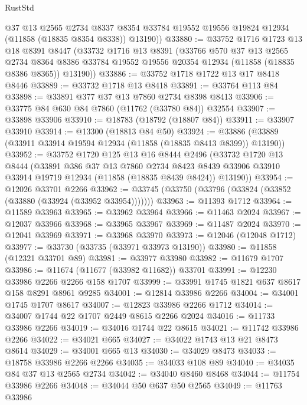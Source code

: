 \begin{lexlean}{RustStd}
\begin{coremodule}
        @37
        @13
        @2565
        @2734
        @8337
        @8354
        @33784
        @19552
        @19556
        @19824
        @12934
        (@11858 (@18835 @8354 @8338))
        @13190))
@33880 := @33752
    @1716
    @1723
    @13
    @18
    @8391
    @8447
    (@33732
      @1716
      @13
      @8391
      (@33766
        @570
        @37
        @13
        @2565
        @2734
        @8364
        @8386
        @33784
        @19552
        @19556
        @20354
        @12934
        (@11858 (@18835 @8386 @8365))
        @13190))
@33886 := @33752 @1718 @1722 @13 @17 @8418 @8446
@33889 := @33732 @1718 @13 @8418
@33891 := @33764 @113 @84
@33898 := @33891 @377 @37 @13 @7860 @2734 @8398 @8413
@33906 := @33775 @84 @630 @84 @7860 (@11762 (@33780 @84)) @32554
@33907 := @33898 @33906
@33910 := @18783 (@18792 (@18807 @84))
@33911 := @33907 @33910
@33914 := @13300 (@18813 @84 @50)
@33924 := @33886 (@33889 (@33911 @33914 @19594 @12934 (@11858 (@18835 @8413 @8399)) @13190))
@33952 := @33752
    @1720
    @125
    @13
    @16
    @8444
    @2496
    (@33732
      @1720
      @13
      @8444
      (@33891
        @386
        @37
        @13
        @7860
        @2734
        @8423
        @8439
        @33906
        @33910
        @33914
        @19719
        @12934
        (@11858 (@18835 @8439 @8424))
        @13190))
@33954 := @12026 @33701 @2266
@33962 := @33745 (@33750 (@33796 (@33824 (@33852 (@33880 (@33924 (@33952 @33954)))))))
@33963 := @11393 @1712
@33964 := @11589 @33963
@33965 := @33962 @33964
@33966 := @11463 @2024
@33967 := @12037 @33966
@33968 := @33965 @33967
@33969 := @11487 @2024
@33970 := @12041 @33969
@33971 := @33968 @33970
@33973 := @12046 (@12048 @1712)
@33977 := @33730 (@33735 (@33971 @33973 @13190))
@33980 := @11858 (@12321 @33701 @89)
@33981 := @33977 @33980
@33982 := @11679 @1707
@33986 := @11674 (@11677 (@33982 @11682)) @33701
@33991 := @12230 @33986 @2266 @2266 @158 @1707
@33999 := @33991 @1745 @1821 @637 @8617 @158 @8291 @8961 @9285
@34001 := @12814 @33986 @2266
@34004 := @34001 @1745 @1707 @8617
@34007 := @12823 @33986 @2266 @1712
@34014 := @34007 @1744 @22 @1707 @2449 @8615 @2266 @2024
@34016 := @11733 @33986 @2266
@34019 := @34016 @1744 @22 @8615
@34021 := @11742 @33986 @2266
@34022 := @34021 @665
@34027 := @34022 @1743 @13 @21 @8473 @8614
@34029 := @34001 @665 @13
@34030 := @34029 @8473
@34033 := @18758 @33986 @2266 @2266
@34035 := @34033 @108 @89
@34040 := @34035 @84 @37 @13 @2565 @2734
@34042 := @34040 @8460 @8468
@34044 := @11754 @33986 @2266
@34048 := @34044 @50 @637 @50 @2565
@34049 := @11763 @33986

\end{coremodule}
\end{lexlean}

